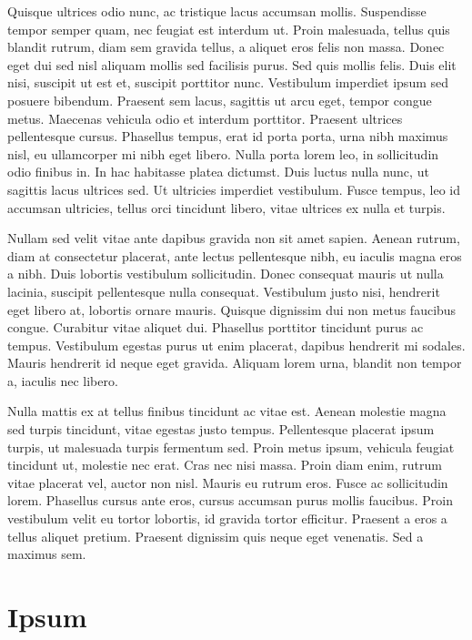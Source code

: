 Quisque ultrices odio nunc, ac tristique lacus accumsan mollis. Suspendisse tempor semper quam, nec feugiat est interdum ut. Proin malesuada, tellus quis blandit rutrum, diam sem gravida tellus, a aliquet eros felis non massa. Donec eget dui sed nisl aliquam mollis sed facilisis purus. Sed quis mollis felis. Duis elit nisi, suscipit ut est et, suscipit porttitor nunc. Vestibulum imperdiet ipsum sed posuere bibendum. Praesent sem lacus, sagittis ut arcu eget, tempor congue metus. Maecenas vehicula odio et interdum porttitor. Praesent ultrices pellentesque cursus. Phasellus tempus, erat id porta porta, urna nibh maximus nisl, eu ullamcorper mi nibh eget libero. Nulla porta lorem leo, in sollicitudin odio finibus in. In hac habitasse platea dictumst. Duis luctus nulla nunc, ut sagittis lacus ultrices sed. Ut ultricies imperdiet vestibulum. Fusce tempus, leo id accumsan ultricies, tellus orci tincidunt libero, vitae ultrices ex nulla et turpis.

Nullam sed velit vitae ante dapibus gravida non sit amet sapien. Aenean rutrum, diam at consectetur placerat, ante lectus pellentesque nibh, eu iaculis magna eros a nibh. Duis lobortis vestibulum sollicitudin. Donec consequat mauris ut nulla lacinia, suscipit pellentesque nulla consequat. Vestibulum justo nisi, hendrerit eget libero at, lobortis ornare mauris. Quisque dignissim dui non metus faucibus congue. Curabitur vitae aliquet dui. Phasellus porttitor tincidunt purus ac tempus. Vestibulum egestas purus ut enim placerat, dapibus hendrerit mi sodales. Mauris hendrerit id neque eget gravida. Aliquam lorem urna, blandit non tempor a, iaculis nec libero.

Nulla mattis ex at tellus finibus tincidunt ac vitae est. Aenean molestie magna sed turpis tincidunt, vitae egestas justo tempus. Pellentesque placerat ipsum turpis, ut malesuada turpis fermentum sed. Proin metus ipsum, vehicula feugiat tincidunt ut, molestie nec erat. Cras nec nisi massa. Proin diam enim, rutrum vitae placerat vel, auctor non nisl. Mauris eu rutrum eros. Fusce ac sollicitudin lorem. Phasellus cursus ante eros, cursus accumsan purus mollis faucibus. Proin vestibulum velit eu tortor lobortis, id gravida tortor efficitur. Praesent a eros a tellus aliquet pretium. Praesent dignissim quis neque eget venenatis. Sed a maximus sem.

\chapter{Ipsum}

